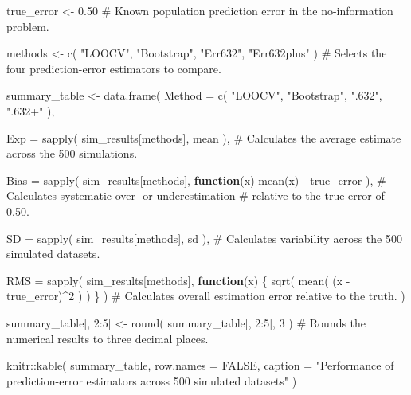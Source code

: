 \documentclass[
  letterpaper,
  DIV=11,
  numbers=noendperiod]{scrreprt}
\newenvironment{Shaded}{\begin{snugshade}}{\end{snugshade}}
\newcommand{\AttributeTok}[1]{\textcolor[rgb]{0.40,0.45,0.13}{#1}}
\newcommand{\CommentTok}[1]{\textcolor[rgb]{0.37,0.37,0.37}{#1}}
\newcommand{\ConstantTok}[1]{\textcolor[rgb]{0.56,0.35,0.01}{#1}}
\newcommand{\ControlFlowTok}[1]{\textcolor[rgb]{0.00,0.23,0.31}{\textbf{#1}}}
\newcommand{\DecValTok}[1]{\textcolor[rgb]{0.68,0.00,0.00}{#1}}
\newcommand{\FloatTok}[1]{\textcolor[rgb]{0.68,0.00,0.00}{#1}}
\newcommand{\FunctionTok}[1]{\textcolor[rgb]{0.28,0.35,0.67}{#1}}
\newcommand{\NormalTok}[1]{\textcolor[rgb]{0.00,0.23,0.31}{#1}}
\newcommand{\OtherTok}[1]{\textcolor[rgb]{0.00,0.23,0.31}{#1}}
\newcommand{\SpecialCharTok}[1]{\textcolor[rgb]{0.37,0.37,0.37}{#1}}
\newcommand{\StringTok}[1]{\textcolor[rgb]{0.13,0.47,0.30}{#1}}
\begin{document}
\begin{Shaded}
\begin{Highlighting}[]
\NormalTok{true\_error }\OtherTok{\textless{}{-}} \FloatTok{0.50}
\CommentTok{\# Known population prediction error in the no{-}information problem.}

\NormalTok{methods }\OtherTok{\textless{}{-}} \FunctionTok{c}\NormalTok{(}
  \StringTok{"LOOCV"}\NormalTok{,}
  \StringTok{"Bootstrap"}\NormalTok{,}
  \StringTok{"Err632"}\NormalTok{,}
  \StringTok{"Err632plus"}
\NormalTok{)}
\CommentTok{\# Selects the four prediction{-}error estimators to compare.}

\NormalTok{summary\_table }\OtherTok{\textless{}{-}} \FunctionTok{data.frame}\NormalTok{(}
  \AttributeTok{Method =} \FunctionTok{c}\NormalTok{(}
    \StringTok{"LOOCV"}\NormalTok{,}
    \StringTok{"Bootstrap"}\NormalTok{,}
    \StringTok{".632"}\NormalTok{,}
    \StringTok{".632+"}
\NormalTok{  ),}

  \AttributeTok{Exp =} \FunctionTok{sapply}\NormalTok{(}
\NormalTok{    sim\_results[methods],}
\NormalTok{    mean}
\NormalTok{  ),}
  \CommentTok{\# Calculates the average estimate across the 500 simulations.}

  \AttributeTok{Bias =} \FunctionTok{sapply}\NormalTok{(}
\NormalTok{    sim\_results[methods],}
    \ControlFlowTok{function}\NormalTok{(x) }\FunctionTok{mean}\NormalTok{(x) }\SpecialCharTok{{-}}\NormalTok{ true\_error}
\NormalTok{  ),}
  \CommentTok{\# Calculates systematic over{-} or underestimation}
  \CommentTok{\# relative to the true error of 0.50.}

  \AttributeTok{SD =} \FunctionTok{sapply}\NormalTok{(}
\NormalTok{    sim\_results[methods],}
\NormalTok{    sd}
\NormalTok{  ),}
  \CommentTok{\# Calculates variability across the 500 simulated datasets.}

  \AttributeTok{RMS =} \FunctionTok{sapply}\NormalTok{(}
\NormalTok{    sim\_results[methods],}
    \ControlFlowTok{function}\NormalTok{(x) \{}
      \FunctionTok{sqrt}\NormalTok{(}
        \FunctionTok{mean}\NormalTok{(}
\NormalTok{          (x }\SpecialCharTok{{-}}\NormalTok{ true\_error)}\SpecialCharTok{\^{}}\DecValTok{2}
\NormalTok{        )}
\NormalTok{      )}
\NormalTok{    \}}
\NormalTok{  )}
  \CommentTok{\# Calculates overall estimation error relative to the truth.}
\NormalTok{)}

\NormalTok{summary\_table[, }\DecValTok{2}\SpecialCharTok{:}\DecValTok{5}\NormalTok{] }\OtherTok{\textless{}{-}} \FunctionTok{round}\NormalTok{(}
\NormalTok{  summary\_table[, }\DecValTok{2}\SpecialCharTok{:}\DecValTok{5}\NormalTok{],}
  \DecValTok{3}
\NormalTok{)}
\CommentTok{\# Rounds the numerical results to three decimal places.}

\NormalTok{knitr}\SpecialCharTok{::}\FunctionTok{kable}\NormalTok{(}
\NormalTok{  summary\_table,}
  \AttributeTok{row.names =} \ConstantTok{FALSE}\NormalTok{,}
  \AttributeTok{caption =} \StringTok{"Performance of prediction{-}error estimators across 500 simulated datasets"}
\NormalTok{)}
\end{Highlighting}
\end{Shaded}
\end{document}
